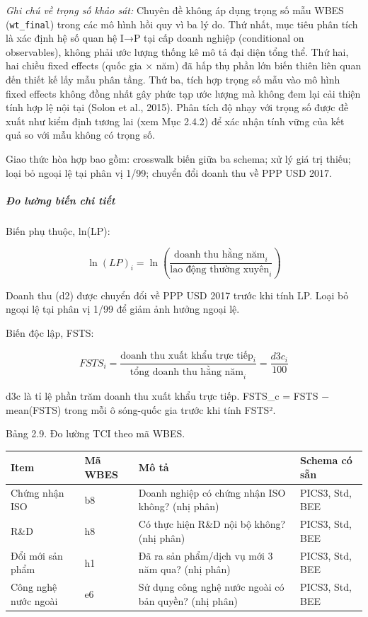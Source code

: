 \documentclass[12pt,a4paper]{article}
\begin{document}
\emph{Ghi chú về trọng số khảo sát:} Chuyên đề không áp dụng trọng số
mẫu WBES (\texttt{wt\_final}) trong các mô hình hồi quy vì ba lý do. Thứ
nhất, mục tiêu phân tích là xác định hệ số quan hệ I→P tại cấp doanh
nghiệp (conditional on observables), không phải ước lượng thống kê mô tả
đại diện tổng thể. Thứ hai, hai chiều fixed effects (quốc gia × năm) đã
hấp thụ phần lớn biến thiên liên quan đến thiết kế lấy mẫu phân tầng.
Thứ ba, tích hợp trọng số mẫu vào mô hình fixed effects không đồng nhất
gây phức tạp ước lượng mà không đem lại cải thiện tính hợp lệ nội tại
(Solon et al., 2015). Phân tích độ nhạy với trọng số được đề xuất như
kiểm định tương lai (xem Mục 2.4.2) để xác nhận tính vững của kết quả so
với mẫu không có trọng số.

Giao thức hòa hợp bao gồm: crosswalk biến giữa ba schema; xử lý giá trị
thiếu; loại bỏ ngoại lệ tại phân vị 1/99; chuyển đổi doanh thu về PPP
USD 2017.

\hypertarget{ux111o-lux1b0ux1eddng-biux1ebfn-chi-tiux1ebft}{%
\subparagraph{Đo lường biến chi
tiết}\label{ux111o-lux1b0ux1eddng-biux1ebfn-chi-tiux1ebft}}

Biến phụ thuộc, ln(LP):

\[\ln(LP)_i = \ln\left(\frac{\text{doanh thu hằng năm}_i}{\text{lao động thường xuyên}_i}\right)\]

Doanh thu (d2) được chuyển đổi về PPP USD 2017 trước khi tính LP. Loại
bỏ ngoại lệ tại phân vị 1/99 để giảm ảnh hưởng ngoại lệ.

Biến độc lập, FSTS:

\[FSTS_i = \frac{\text{doanh thu xuất khẩu trực tiếp}_i}{\text{tổng doanh thu hằng năm}_i} = \frac{d3c_i}{100}\]

d3c là tỉ lệ phần trăm doanh thu xuất khẩu trực tiếp. FSTS\_c = FSTS −
mean(FSTS) trong mỗi ô sóng-quốc gia trước khi tính FSTS².

Bảng 2.9. Đo lường TCI theo mã WBES.

\begin{longtable}[]{@{}llll@{}}
\toprule\noalign{}
Item & Mã WBES & Mô tả & Schema có sẵn \\
\midrule\noalign{}
\endhead
\bottomrule\noalign{}
\endlastfoot
Chứng nhận ISO & b8 & Doanh nghiệp có chứng nhận ISO không? (nhị phân) &
PICS3, Std, BEE \\
R\&D & h8 & Có thực hiện R\&D nội bộ không? (nhị phân) & PICS3, Std,
BEE \\
Đổi mới sản phẩm & h1 & Đã ra sản phẩm/dịch vụ mới 3 năm qua? (nhị phân)
& PICS3, Std, BEE \\
Công nghệ nước ngoài & e6 & Sử dụng công nghệ nước ngoài có bản quyền?
(nhị phân) & PICS3, Std, BEE \\
\end{longtable}
\end{document}
